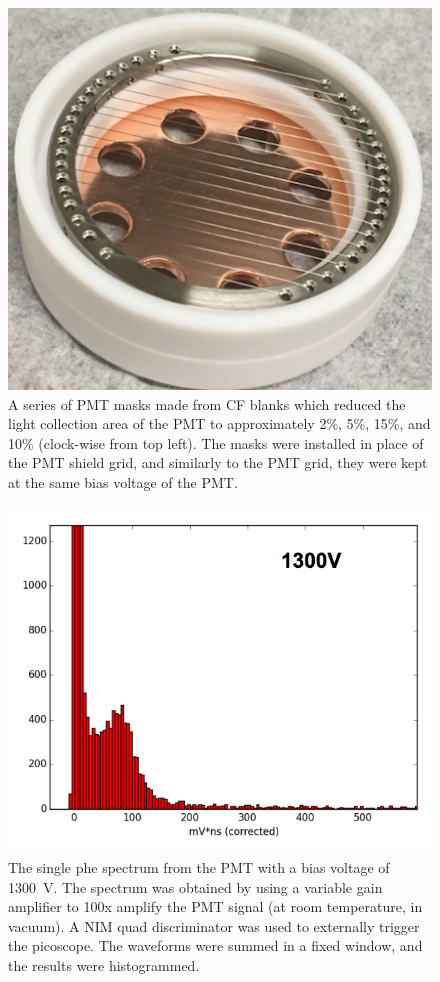 \begin{figure}[htbp]
\begin{center}
\includegraphics[width=\halffig]{figures/etrains/mask4.png}
\caption{A series of \ac{PMT} masks made from \ac{CF} blanks which reduced the light collection area of the \ac{PMT} to approximately 2\%, 5\%, 15\%, and 10\% (clock-wise from top left). The masks were installed in place of the \ac{PMT} shield grid, and similarly to the \ac{PMT} grid, they were kept at the same bias voltage of the \ac{PMT}. }
\label{fig:pmt_masks}
\end{center}
\end{figure}

\begin{figure}[htbp]
\begin{center}
\includegraphics[width=\halffig]{figures/etrains/1300V_singlephe.png}
\caption{The single phe spectrum from the \ac{PMT} with a bias voltage of 1300~V. The spectrum was obtained by using a variable gain amplifier to 100x amplify the \ac{PMT} signal (at room temperature, in vacuum). A \ac{NIM} quad discriminator was used to externally trigger the picoscope. The waveforms were summed in a fixed window, and the results were histogrammed.}
\label{fig:pmt_masks}
\end{center}
\end{figure}

